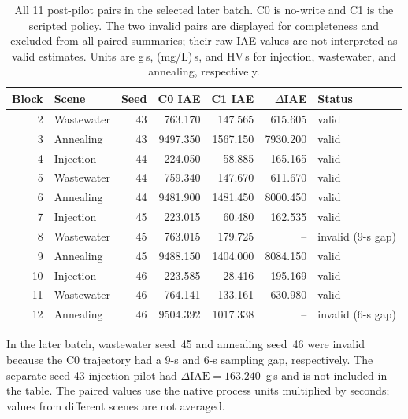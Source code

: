 \documentclass[10pt]{article}
\begin{document}
\begin{table}[htbp]
\centering
\caption{All 11 post-pilot pairs in the selected later batch. C0 is no-write and C1 is the scripted policy. The two invalid pairs are displayed for completeness and excluded from all paired summaries; their raw IAE values are not interpreted as valid estimates. Units are g\,s, (mg/L)\,s, and HV\,s for injection, wastewater, and annealing, respectively.}
\label{tab:s7-all-pairs}
\footnotesize
\setlength{\tabcolsep}{4pt}
\begin{tabular}{@{}r l r r r r l@{}}
\toprule
Block & Scene & Seed & C0 IAE & C1 IAE & $\Delta$IAE & Status \\
\midrule
2 & Wastewater & 43 & 763.170 & 147.565 & 615.605 & valid \\
3 & Annealing & 43 & 9497.350 & 1567.150 & 7930.200 & valid \\
4 & Injection & 44 & 224.050 & 58.885 & 165.165 & valid \\
5 & Wastewater & 44 & 759.340 & 147.670 & 611.670 & valid \\
6 & Annealing & 44 & 9481.900 & 1481.450 & 8000.450 & valid \\
7 & Injection & 45 & 223.015 & 60.480 & 162.535 & valid \\
8 & Wastewater & 45 & 763.015 & 179.725 & -- & invalid (9-s gap) \\
9 & Annealing & 45 & 9488.150 & 1404.000 & 8084.150 & valid \\
10 & Injection & 46 & 223.585 & 28.416 & 195.169 & valid \\
11 & Wastewater & 46 & 764.141 & 133.161 & 630.980 & valid \\
12 & Annealing & 46 & 9504.392 & 1017.338 & -- & invalid (6-s gap) \\
\bottomrule
\end{tabular}
\end{table}

In the later batch, wastewater seed~45 and annealing seed~46 were invalid because the C0 trajectory had a 9-s and 6-s sampling gap, respectively. The separate seed-43 injection pilot had $\Delta\mathrm{IAE}=163.240$~g\,s and is not included in the table. The paired values use the native process units multiplied by seconds; values from different scenes are not averaged.
\end{document}
